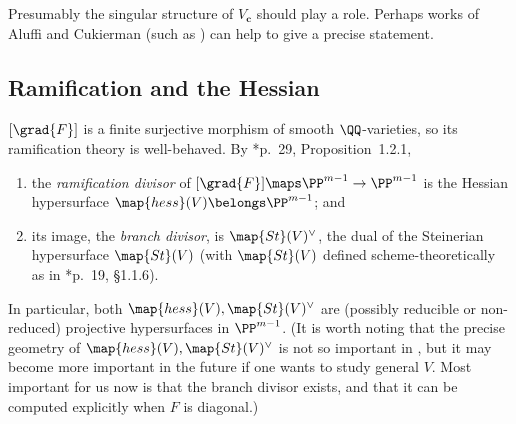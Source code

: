 \documentclass[12pt]{report}
\begin{document}
Presumably the singular structure of $V_{\bm{c}}$ should play a role.
Perhaps works of Aluffi and Cukierman (such as \cites{aluffi1993multiplicities,aluffi1995singular})
can help to give a precise statement.

\subsection{Ramification and the Hessian}

$[\grad{F}]$ is a finite surjective morphism of smooth $\QQ$-varieties,
so its ramification theory is well-behaved.
By \cite{dolgachev2012classical}*{p.~29, Proposition~1.2.1},
\begin{enumerate}[(1)]
    \item the \emph{ramification divisor} of $[\grad{F}]\maps\PP^{m-1}\to\PP^{m-1}$
    is the Hessian hypersurface $\map{hess}(V)\belongs\PP^{m-1}$;
    and
    
    \item its image, the \emph{branch divisor},
    is $\map{St}(V)^\vee$, the dual of the Steinerian hypersurface $\map{St}(V)$
    (with $\map{St}(V)$ defined scheme-theoretically as in \cite{dolgachev2012classical}*{p.~19, \S1.1.6}).
\end{enumerate}
In particular,
both $\map{hess}(V),\map{St}(V)^\vee$ are
(possibly reducible or non-reduced)
projective hypersurfaces in $\PP^{m-1}$.
(It is worth noting that the precise geometry of $\map{hess}(V),\map{St}(V)^\vee$ is not so important in \cite{wang2021_isolating_special_solutions}, but it may become more important in the future if one wants to study general $V$.
Most important for us now is that the branch divisor exists, and that it can be computed explicitly when $F$ is diagonal.)
\end{document}
